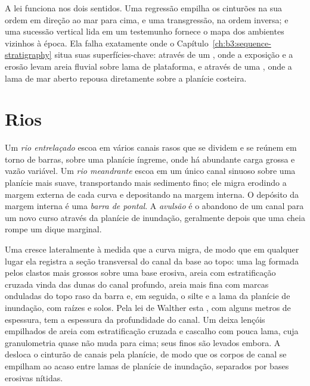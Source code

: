 A lei funciona nos dois sentidos. Uma regressão empilha os cinturões na sua ordem em direção ao mar
para cima, e uma transgressão, na ordem inversa; e uma sucessão vertical lida em um testemunho
fornece o mapa dos ambientes vizinhos à época. Ela falha exatamente
onde o Capítulo~\ref{ch:b3:sequence-stratigraphy} situa suas superfícies-chave:
através de um , onde a exposição e a erosão levam areia fluvial
sobre lama de plataforma, e através de uma , onde a lama de mar aberto repousa diretamente sobre
a planície costeira.

\section{Rios}\label{sec:b3:facies-models:rivers}

\begin{definition}\label{def:b3:facies-models:rivers}
Um \emph{rio entrelaçado} escoa em vários canais rasos
que se dividem e se reúnem em torno de barras, sobre uma planície íngreme, onde há
abundante carga grossa e vazão variável. Um \emph{rio meandrante}
escoa em um único canal sinuoso sobre uma planície mais suave, transportando mais
sedimento fino; ele migra erodindo a margem externa de cada curva e depositando na
margem interna. O depósito da margem interna é uma \emph{barra de
pontal}. A \emph{avulsão} é o abandono de
um canal para um novo curso através da planície de inundação, geralmente depois que uma
cheia rompe um dique marginal.
\end{definition}

Uma  cresce lateralmente à medida que a curva migra, de modo que em qualquer lugar ela registra
a seção transversal do canal da base ao topo: uma lag formada pelos clastos mais grossos
sobre uma base erosiva, areia com estratificação cruzada vinda das dunas do
canal profundo, areia mais fina com marcas onduladas do topo raso da barra e, em seguida,
o silte e a lama da planície de inundação, com raízes e solos. Pela lei de Walther
esta , com alguns metros de espessura, tem a
espessura da profundidade do canal. Um  deixa lençóis empilhados de areia com estratificação cruzada
e cascalho com pouca lama, cuja granulometria quase não muda para cima; seus finos são
levados embora. A  desloca o cinturão de canais pela planície, de modo que
os corpos de canal se empilham ao acaso entre lamas de planície de inundação, separados por
bases erosivas nítidas.

